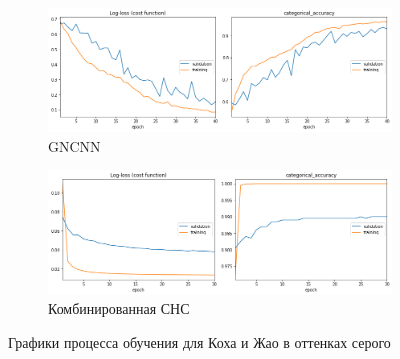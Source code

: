 \begin{figure}[p]
    \centering

    \begin{subfigure}{\textwidth}
        \includegraphics[width=\textwidth]{include/graphics/experimental_plots/grayscale/gncnn_koch}
                    \caption{GNCNN}
    \end{subfigure}

    \begin{subfigure}{\textwidth}
        \includegraphics[width=\textwidth]{include/graphics/experimental_plots/grayscale/mixed_koch}
                    \caption{Комбинированная СНС}
    \end{subfigure}

   \caption{Графики процесса обучения для Коха и Жао в оттенках серого}
    \label{fig:GrayscalePlotsKoch}
\end{figure}

